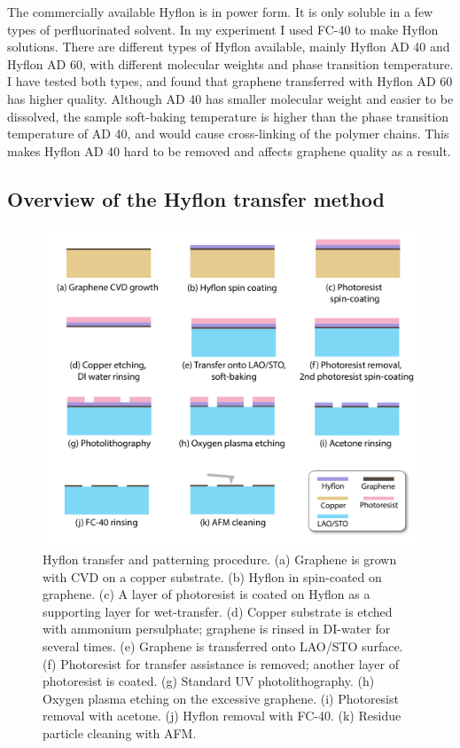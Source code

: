 \documentclass[pdflatex, sectionletters, 12pt]{pittetd}    %
\begin{document}
The commercially available Hyflon is in power form. It is only soluble in a few types of perfluorinated solvent. In my experiment I used FC-40 to make Hyflon solutions. There are different types of Hyflon available, mainly Hyflon AD 40 and Hyflon AD 60, with different molecular weights and phase transition temperature. I have tested both types, and found that graphene transferred with Hyflon AD 60 has higher quality. Although AD 40 has smaller molecular weight and easier to be dissolved, the sample soft-baking temperature is higher than the phase transition temperature of AD 40, and would cause cross-linking of the polymer chains. This makes Hyflon AD 40 hard to be removed and affects graphene quality as a result. 

\subsection{Overview of the Hyflon transfer method}

\begin{figure}[p]
	\centering
	\includegraphics[width=1.0\textwidth]{Drawing/HyflonTransfer.pdf}
	\caption{Hyflon transfer and patterning procedure. (a) Graphene is grown with CVD on a copper substrate. (b) Hyflon in spin-coated on graphene. (c) A layer of photoresist is coated on Hyflon as a supporting layer for wet-transfer. (d) Copper substrate is etched with ammonium persulphate; graphene is rinsed in DI-water for several times. (e) Graphene is transferred onto LAO/STO surface. (f) Photoresist for transfer assistance is removed; another layer of photoresist is coated. (g) Standard UV photolithography. (h) Oxygen plasma etching on the excessive graphene. (i) Photoresist removal with acetone. (j) Hyflon removal with FC-40. (k) Residue particle cleaning with AFM.}
	\label{FIG:HyflonTransfer}
\end{figure}
\end{document}
